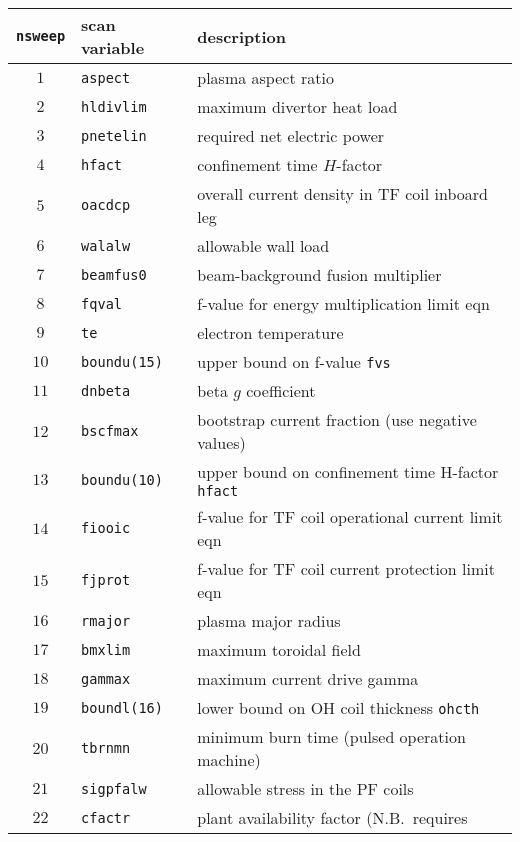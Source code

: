 \documentclass[11pt,a4paper]{report}
\begin{document}
\begin{table}[tbph]
\begin{center}

\begin{tabular}{||c|l|l||} \hline
\texttt{nsweep} & scan variable & description \\ \hline
$1 $ & \texttt{aspect}     & plasma aspect ratio \\
$2 $ & \texttt{hldivlim}   & maximum divertor heat load \\
$3 $ & \texttt{pnetelin}   & required net electric power \\
$4 $ & \texttt{hfact}      & confinement time $H$-factor \\
$5 $ & \texttt{oacdcp}     & overall current density in TF coil inboard leg \\
$6 $ & \texttt{walalw}     & allowable wall load \\
$7 $ & \texttt{beamfus0}   & beam-background fusion multiplier \\
$8 $ & \texttt{fqval}      & f-value for energy multiplication limit eqn \\
$9 $ & \texttt{te}         & electron temperature \\
$10$ & \texttt{boundu(15)} & upper bound on f-value \texttt{fvs} \\
$11$ & \texttt{dnbeta}     & beta $g$ coefficient \\
$12$ & \texttt{bscfmax}    & bootstrap current fraction (use negative values) \\
$13$ & \texttt{boundu(10)} & upper bound on confinement time H-factor \texttt{hfact}\\
$14$ & \texttt{fiooic}     & f-value for TF coil operational current limit eqn \\
$15$ & \texttt{fjprot}     & f-value for TF coil current protection limit eqn \\
$16$ & \texttt{rmajor}     & plasma major radius \\
$17$ & \texttt{bmxlim}     & maximum toroidal field \\
$18$ & \texttt{gammax}     & maximum current drive gamma \\
$19$ & \texttt{boundl(16)} & lower bound on OH coil thickness \texttt{ohcth} \\
$20$ & \texttt{tbrnmn}     & minimum burn time (pulsed operation machine) \\
$21$ & \texttt{sigpfalw}   & allowable stress in the PF coils \\
$22$ & \texttt{cfactr}     & plant availability factor (N.B.\ requires

\end{tabular}
\end{center}
\end{table}
\end{document}
